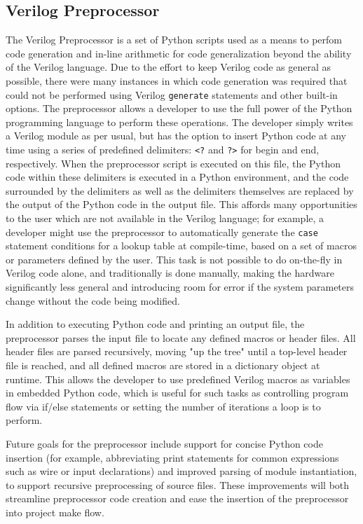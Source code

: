 \documentclass[12pt]{article}
\begin{document}
\subsection{Verilog Preprocessor}
The Verilog Preprocessor is a set of Python scripts used as a means to perfom code generation and in-line arithmetic for code generalization beyond the ability of the Verilog language. Due to the effort to keep Verilog code as general as possible, there were many instances in which code generation was required that could not be performed using Verilog \texttt{generate} statements and other built-in options. The preprocessor allows a developer to use the full power of the Python programming language to perform these operations. The developer simply writes a Verilog module as per usual, but has the option to insert Python code at any time using a series of predefined delimiters: \verb|<?| and \verb|?>| for begin and end, respectively. When the preprocessor script is executed on this file, the Python code within these delimiters is executed in a Python environment, and the code surrounded by the delimiters as well as the delimiters themselves are replaced by the output of the Python code in the output file. This affords many opportunities to the user which are not available in the Verilog language; for example, a developer might use the preprocessor to automatically generate the \texttt{case} statement conditions for a lookup table at compile-time, based on a set of macros or parameters defined by the user. This task is not possible to do on-the-fly in Verilog code alone, and traditionally is done manually, making the hardware significantly less general and introducing room for error if the system parameters change without the code being modified.

In addition to executing Python code and printing an output file, the preprocessor parses the input file to locate any defined macros or header files. All header files are parsed recursively, moving "up the tree" until a top-level header file is reached, and all defined macros are stored in a dictionary object at runtime. This allows the developer to use predefined Verilog macros as variables in embedded Python code, which is useful for such tasks as controlling program flow via if/else statements or setting the number of iterations a loop is to perform.  

Future goals for the preprocessor include support for concise Python code insertion (for example, abbreviating print statements for common expressions such as wire or input declarations) and improved parsing of module instantiation, to support recursive preprocessing of source files. These improvements will both streamline preprocessor code creation and ease the insertion of the preprocessor into project make flow.
\end{document}
